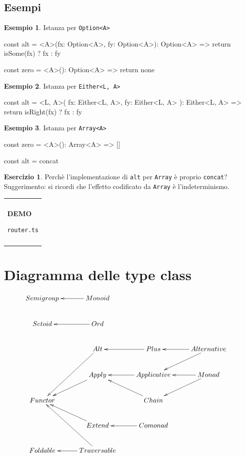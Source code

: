 \documentclass[12pt]{article}
\theoremstyle{definition}
\newtheorem{example}{Esempio}[section]
\newtheorem{exercise}{Esercizio}[section]
\newenvironment{demo}
    {\begin{center}
    \begin{tabular}{|p{0.9\textwidth}|}
    \hline\\
    }
    {
    \\\\\hline
    \end{tabular}
    \end{center}
    }
\newenvironment{code}
  {\vspace{0.5cm} \VerbatimEnvironment\begin{typescriptcode}}
  {\end{typescriptcode} \vspace{0.2cm}}
\begin{document}
\subsection{Esempi}

\begin{example}
Istanza per \texttt{Option<A>}

\begin{code}
const alt = <A>(fx: Option<A>, fy: Option<A>): Option<A> => {
  return isSome(fx) ? fx : fy
}

const zero = <A>(): Option<A> => {
  return none
}
\end{code}
\end{example}

\begin{example}
Istanza per \texttt{Either<L, A>}

\begin{code}
const alt = <L, A>(
  fx: Either<L, A>,
  fy: Either<L, A>
): Either<L, A> => {
  return isRight(fx) ? fx : fy
}
\end{code}
\end{example}

\begin{example}
Istanza per \texttt{Array<A>}

\begin{code}
const zero = <A>(): Array<A> => []

const alt = concat
\end{code}
\end{example}

\begin{exercise}
Perchè l'implementazione di \texttt{alt} per \texttt{Array} è proprio \texttt{concat}?
Suggerimento: si ricordi che l'effetto codificato da \texttt{Array} è l'indeterminismo.
\end{exercise}

\begin{demo}
\begin{center}
\textbf{DEMO}

\texttt{router.ts}
\end{center}
\end{demo}

\newpage

\section{Diagramma delle type class}

\[
\xymatrix{
  Semigroup & Monoid \ar[l] \\
  Setoid & Ord \ar[l] \\
  & Alt \ar[ldd] & Plus \ar[l] & Alternative \ar[l] \ar[ld] \\
  & Apply \ar[ld] & Applicative \ar[l] & Monad \ar[l] \ar[ld] \\
  Functor & & Chain \ar[lu] \\
  & Extend \ar[lu] & Comonad \ar[l] \\
  Foldable & Traversable \ar[l] \ar[uul] \\
}
\]
\end{document}
